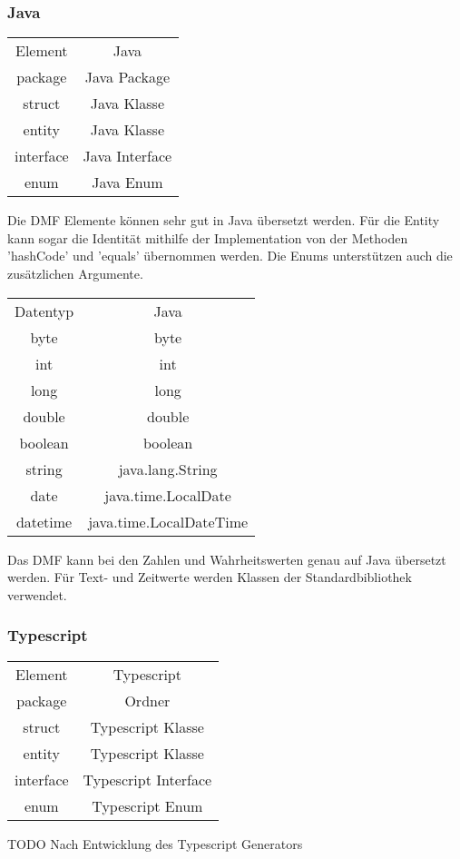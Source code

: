 \documentclass[./einleitung.tex]{subfiles}
\begin{document}
\subsubsection{Java}
\begin{center}
\begin{tabular}{| c || c |}
\hline
Element & Java \\
\hhline{|=||=|}
package & Java Package \\
\hline
struct & Java Klasse\\
\hline
entity & Java Klasse \\
\hline
interface & Java Interface \\
\hline
enum & Java Enum \\
\hline
\end{tabular}
\end{center}
Die DMF Elemente können sehr gut in Java übersetzt werden. Für die Entity kann sogar die Identität mithilfe der Implementation von der Methoden 'hashCode' und 'equals' übernommen werden. Die Enums unterstützen auch die zusätzlichen Argumente.

\begin{center}
\begin{tabular}{| c || c |}
\hline
Datentyp & Java \\
\hhline{|=||=|}
byte & byte\\
\hline
int & int\\
\hline
long & long\\
\hline
double & double\\
\hline
boolean & boolean \\
\hline
string & java.lang.String \\
\hline
date & java.time.LocalDate \\
\hline
datetime & java.time.LocalDateTime\\
\hline
\end{tabular}
\end{center}
Das DMF kann bei den Zahlen und Wahrheitswerten genau auf Java übersetzt werden. Für Text- und Zeitwerte werden Klassen der Standardbibliothek verwendet.

\subsubsection{Typescript}
\begin{center}
\begin{tabular}{| c || c |}
\hline
Element & Typescript \\
\hhline{|=||=|}
package & Ordner \\
\hline
struct & Typescript Klasse\\
\hline
entity & Typescript Klasse \\
\hline
interface & Typescript Interface \\
\hline
enum & Typescript Enum \\
\hline
\end{tabular}
\end{center}
TODO Nach Entwicklung des Typescript Generators
\end{document}
